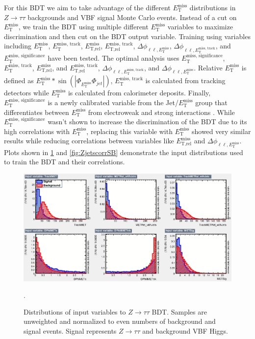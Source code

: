 For this BDT we aim to take advantage of the different $E_{\text{T}}^{\text{miss}}$ distributions in $Z\rightarrow\tau\tau$ backgrounds and VBF signal Monte Carlo events. Instead of a cut on $E_{\text{T}}^{\text{miss}}$, we train the BDT using multiple different $E_{\text{T}}^{\text{miss}}$ variables to maximize discrimination and then cut on the BDT output variable. Training using variables including $E_{\text{T}}^{\text{miss}}$, $\ensuremath{E_{\text{T}}^{\text{miss, track}}}$, $\ensuremath{E_{\text{T,rel}}^{\text{miss}}}$, $\ensuremath{E_{\text{T,rel}}^{\text{miss, track}}}$, $\Delta\phi_{\ell\ell,E_{\text{T}}^{\text{miss}}}$, $\Delta\phi_{\ell\ell,E_{\text{T}}^{\text{miss, track}}}$, and $\ensuremath{E_{\text{T}}^{\text{miss, significance}}}$ have been tested. The optimal analysis uses $\ensuremath{E_{\text{T}}^{\text{miss, significance}}}$, $\ensuremath{E_{\text{T}}^{\text{miss, track}}}$, $\ensuremath{E_{\text{T,rel}}^{\text{miss}}}$, and $\ensuremath{E_{\text{T,rel}}^{\text{miss, track}}}$, $\ensuremath{\Delta\phi_{\ell\ell,E_{\text{T}}^{\text{miss, track}}}}$, and $\ensuremath{\Delta\phi_{\ell\ell,E_{\text{T}}^{\text{miss}}}}$. Relative $E_{\text{T}}^{\text{miss}}$ is defined as $E_{\text{T}}^{\text{miss}} * \sin(|\Phi_{E_{\text{T}}^{\text{miss}}}\Phi_{jet}|)$, $\ensuremath{E_{\text{T}}^{\text{miss, track}}}$ is calculated from tracking detectors while $E_{\text{T}}^{\text{miss}}$ is calculated from calorimeter deposits. Finally, $\ensuremath{E_{\text{T}}^{\text{miss, significance}}}$ is a newly calibrated variable from the Jet/$E_{\text{T}}^{\text{miss}}$ group that differentiates between $E_{\text{T}}^{\text{miss}}$ from electroweak and strong interactions \cite{JETEtmiss}. While $\ensuremath{E_{\text{T}}^{\text{miss, significance}}}$ wasn't shown to increase the discrimination of the BDT due to its high correlations with $E_{\text{T}}^{\text{miss}}$, replacing this variable with $E_{\text{T}}^{\text{miss}}$ showed very similar results while reducing correlations between variables like $\ensuremath{E_{\text{T,rel}}^{\text{miss}}}$ and $\ensuremath{\Delta\phi_{\ell\ell,E_{\text{T}}^{\text{miss}}}}$. Plots shown in \ref{fig:ZjetsBDTinput} and \ref{fig:ZjetscorrSB} demonstrate the input distributions used to train the BDT and their correlations.
\begin{figure}[!htbp]
    \centering
    \includegraphics[width=0.85\linewidth]{Pictures/variables_id_c1.eps}
    \caption{Distributions of input variables to $Z\rightarrow\tau\tau$ BDT. Samples are unweighted and normalized to even numbers of background and signal events. Signal represents $Z\rightarrow\tau\tau$ and background VBF Higgs.}.
    \label{fig:ZjetsBDTinput}
\end{figure}
